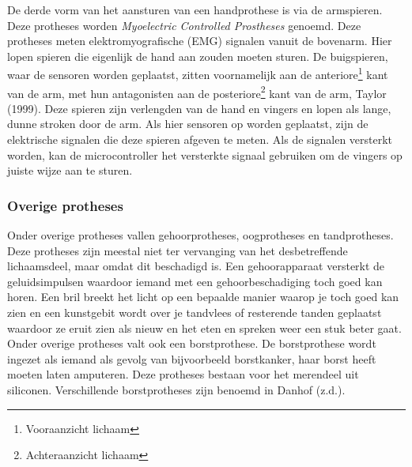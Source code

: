De derde vorm van het aansturen van een handprothese is via de
armspieren. Deze protheses worden \emph{Myoelectric Controlled
Prostheses} genoemd. Deze protheses meten elektromyografische (EMG)
signalen vanuit de bovenarm. Hier lopen spieren die eigenlijk de hand
aan zouden moeten sturen. De buigspieren, waar de sensoren worden
geplaatst, zitten voornamelijk aan de anteriore\footnote{Vooraanzicht
  lichaam} kant van de arm, met hun antagonisten aan de
posteriore\footnote{Achteraanzicht lichaam} kant van de arm, Taylor
(1999). Deze spieren zijn verlengden van de hand en vingers en lopen als
lange, dunne stroken door de arm. Als hier sensoren op worden geplaatst,
zijn de elektrische signalen die deze spieren afgeven te meten. Als de
signalen versterkt worden, kan de microcontroller het versterkte signaal
gebruiken om de vingers op juiste wijze aan te sturen.

\hypertarget{overige-protheses}{%
\subsubsection*{Overige protheses}\label{overige-protheses}}

Onder overige protheses vallen gehoorprotheses, oogprotheses en
tandprotheses. Deze protheses zijn meestal niet ter vervanging van het
desbetreffende lichaamsdeel, maar omdat dit beschadigd is. Een
gehoorapparaat versterkt de geluidsimpulsen waardoor iemand met een
gehoorbeschadiging toch goed kan horen. Een bril breekt het licht op een
bepaalde manier waarop je toch goed kan zien en een kunstgebit wordt
over je tandvlees of resterende tanden geplaatst waardoor ze eruit zien
als nieuw en het eten en spreken weer een stuk beter gaat. Onder overige
protheses valt ook een borstprothese. De borstprothese wordt ingezet als
iemand als gevolg van bijvoorbeeld borstkanker, haar borst heeft moeten
laten amputeren. Deze protheses bestaan voor het merendeel uit
siliconen. Verschillende borstprotheses zijn benoemd in Danhof (z.d.).
